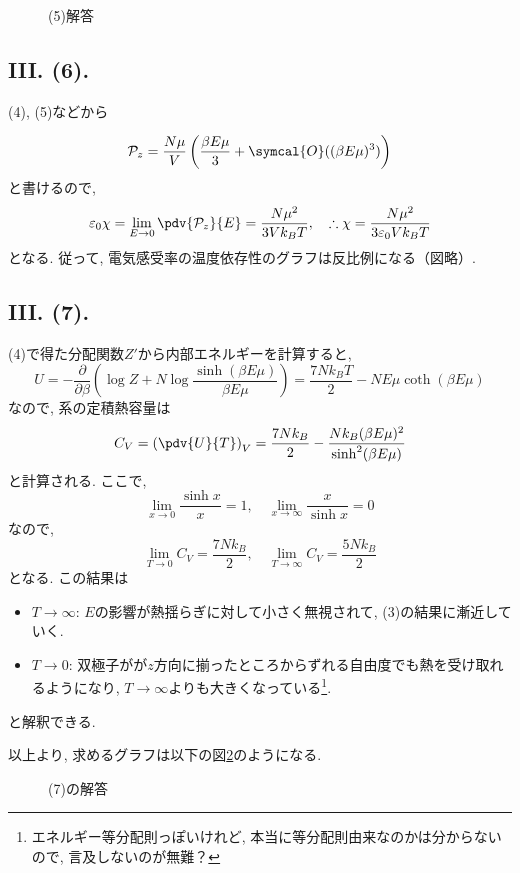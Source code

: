 \begin{figure}[H]
  \centering
  
  \caption{(5)解答}\label{fig:stat_III(5)}
\end{figure}


\subsection*{III. (6). }

(4), (5)などから

\begin{equation}
  \mathcal{P}_z=\frac{N\mu}{V}\left( \frac{\beta E\mu}{3}+\symcal{O}((\beta E\mu)^3) \right)
\end{equation}
と書けるので, 
\begin{equation}
  \varepsilon_0\chi=\lim_{E\to 0}\pdv{\mathcal{P}_z}{E}=\frac{N\mu^2}{3Vk_B T}, \quad\therefore \chi=\frac{N\mu^2}{3\varepsilon_0 Vk_B T}
\end{equation}
となる. 
従って, 電気感受率の温度依存性のグラフは反比例になる（図略）. 

\subsection*{III. (7). }
(4)で得た分配関数$Z'$から内部エネルギーを計算すると, 
\begin{equation}
  U=-\frac{\partial}{\partial \beta}\left( \log{Z}+N\log{\frac{\sinh(\beta E\mu)}{\beta E\mu}} \right)=\frac{7Nk_B T}{2}-NE\mu\coth(\beta E\mu)
\end{equation}
なので, 系の定積熱容量は
\begin{equation}
  C_V=\left( \pdv{U}{T} \right)_V=\frac{7Nk_B}{2}-\frac{Nk_B (\beta E\mu)^2}{\sinh^2(\beta E\mu)}
\end{equation}
と計算される. 
ここで, 
\begin{equation}
  \lim_{x\to 0}\frac{\sinh x}{x}=1, \quad \lim_{x\to\infty}\frac{x}{\sinh{x}}=0
\end{equation}
なので, 
\begin{equation}
  \lim_{T\to 0}C_V=\frac{7Nk_B}{2}, \quad \lim_{T\to \infty}C_V=\frac{5Nk_B}{2}
\end{equation}
となる. 
この結果は
\begin{itemize}
  \item $T\to\infty$: $E$の影響が熱揺らぎに対して小さく無視されて, (3)の結果に漸近していく. 
  \item $T\to 0$: 双極子がが$z$方向に揃ったところからずれる自由度でも熱を受け取れるようになり, $T\to\infty$よりも大きくなっている\footnote{エネルギー等分配則っぽいけれど, 本当に等分配則由来なのかは分からないので, 言及しないのが無難？}. 
\end{itemize}
と解釈できる. 

以上より, 求めるグラフは以下の図\ref{fig:statIII_(7)}のようになる. 
\begin{figure}[H]
  \centering
  
  \caption{(7)の解答}\label{fig:statIII_(7)}
\end{figure}







